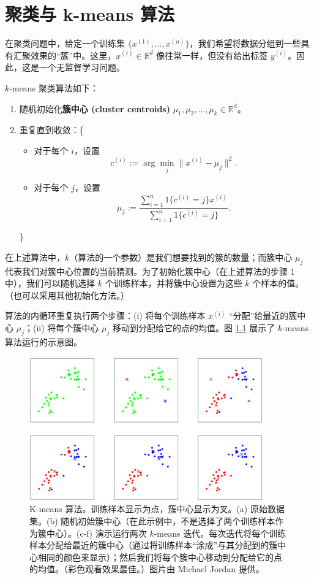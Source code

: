 \chapter{聚类与 k-means 算法}

在聚类问题中，给定一个训练集 $\{x^{(1)}, \dots, x^{(n)}\}$，我们希望将数据分组到一些具有汇聚效果的“簇”中。这里，$x^{(i)} \in \mathbb{R}^d$ 像往常一样，但没有给出标签 $y^{(i)}$。因此，这是一个无监督学习问题。

$k$-means 聚类算法如下：

\begin{enumerate}
    \item 随机初始化\textbf{簇中心 (cluster centroids)} $\mu_1, \mu_2, \dots, \mu_k \in \mathbb{R}^d$。
    \item 重复直到收敛：\{
        \begin{itemize}
            \item[] 对于每个 $i$，设置
            \[
                c^{(i)} := \arg \min_j \|x^{(i)} - \mu_j\|^2.
            \]
            \item[] 对于每个 $j$，设置
            \[
                \mu_j := \frac{\sum_{i=1}^n {1}\{c^{(i)} = j\} x^{(i)}}{\sum_{i=1}^n {1}\{c^{(i)} = j\}}.
            \]
        \end{itemize}

    \}
\end{enumerate}

在上述算法中，$k$（算法的一个参数）是我们想要找到的簇的数量；而簇中心 $\mu_j$ 代表我们对簇中心位置的当前猜测。为了初始化簇中心（在上述算法的步骤 1 中），我们可以随机选择 $k$ 个训练样本，并将簇中心设置为这些 $k$ 个样本的值。（也可以采用其他初始化方法。）

算法的内循环重复执行两个步骤：(i) 将每个训练样本 $x^{(i)}$ “分配”给最近的簇中心 $\mu_j$；(ii) 将每个簇中心 $\mu_j$ 移动到分配给它的点的均值。图 \ref{fig:10.1} 展示了 $k$-means 算法运行的示意图。

\begin{figure}[H]
    \centering
    \includegraphics[width=0.9\textwidth]{figs/k-means.png}
    \caption{K-means 算法。训练样本显示为点，簇中心显示为叉。(a) 原始数据集。(b) 随机初始簇中心（在此示例中，不是选择了两个训练样本作为簇中心）。(c-f) 演示运行两次 $k$-means 迭代。每次迭代将每个训练样本分配给最近的簇中心（通过将训练样本“涂成”与其分配到的簇中心相同的颜色来显示）；然后我们将每个簇中心移动到分配给它的点的均值。（彩色观看效果最佳。）图片由 Michael Jordan 提供。}
    \label{fig:10.1}
\end{figure}

